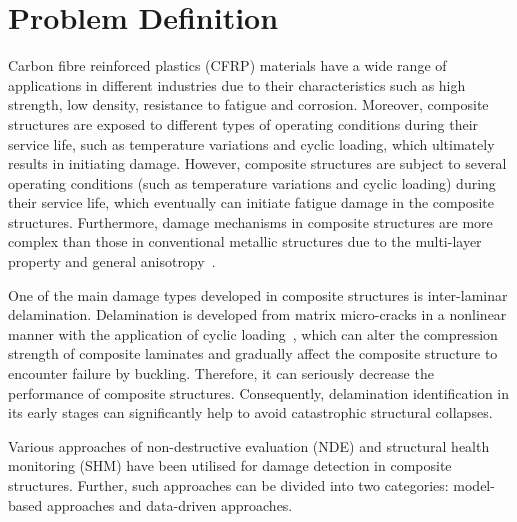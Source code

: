 \section{Problem Definition}
\label{sec11}
Carbon fibre reinforced plastics (CFRP) materials have a wide range of applications in different industries due to their characteristics such as high strength, low density, resistance to fatigue and corrosion.
Moreover, composite structures are exposed to different types of operating conditions during their service life, such as temperature variations and cyclic loading, which ultimately results in initiating damage. 
However, composite structures are subject to several operating conditions (such as temperature variations and cyclic loading) during their service life, which eventually can initiate fatigue damage in the composite structures.
Furthermore, damage mechanisms in composite structures are more complex than those in conventional metallic structures due to the multi-layer property and general anisotropy~\cite{Wu2021}. 

One of the main damage types developed in composite structures is inter-laminar delamination.
Delamination is developed from matrix micro-cracks in a nonlinear manner with the application of cyclic loading~\cite{Reifsnider1983, Wu2021}, which can alter the compression strength of composite laminates and gradually affect the composite structure to encounter failure by buckling. Therefore, it can seriously decrease the performance of composite structures.
Consequently, delamination identification in its early stages can significantly help to avoid catastrophic structural collapses.

Various approaches of non-destructive evaluation (NDE) and structural health monitoring (SHM) have been utilised for damage detection in composite structures. 
Further, such approaches can be divided into two categories: model-based approaches and data-driven approaches.

